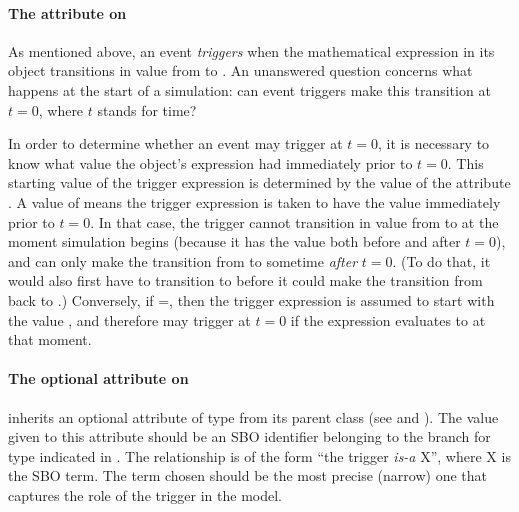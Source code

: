\paragraph{The  attribute on \Trigger}
\label{sec:trigger-initialvalue}

As mentioned above, an event \emph{triggers} when the mathematical
expression in its \Trigger object transitions in value from
 to .  An unanswered question concerns what
happens at the start of a simulation: can event triggers make this
transition at $t = 0$, where $t$ stands for time?

In order to determine whether an event may trigger at $t = 0$, it is
necessary to know what value the \Trigger object's 
expression had immediately prior to $t = 0$.  This starting value
of the trigger expression is determined by the value of the
 attribute .  A value of 
means the trigger expression is taken to have the value 
immediately prior to $t = 0$.  In that case, the trigger cannot
transition in value from  to  at the moment
simulation begins (because it has the value  both before
and after $t = 0$), and can only make the transition from
 to  sometime \emph{after} $t = 0$.  (To do
that, it would also first have to transition to  before
it could make the transition from  back to .)
Conversely, if =, then the trigger
expression is assumed to start with the value , and
therefore may trigger at $t = 0$ if the expression evaluates to
 at that moment.

%


\paragraph{The optional  attribute on \Trigger}
\label{sec:trigger-sboterm}

\Trigger inherits an optional  attribute of type
 from its parent class \SBase (see
 and ).  The value
given to this attribute should be an SBO identifier belonging to
the branch for type \Trigger indicated in
.  The relationship is of the
form ``the trigger \emph{is-a} X'', where X is the SBO term.  The
term chosen should be the most precise (narrow) one that captures
the role of the trigger in the model.

